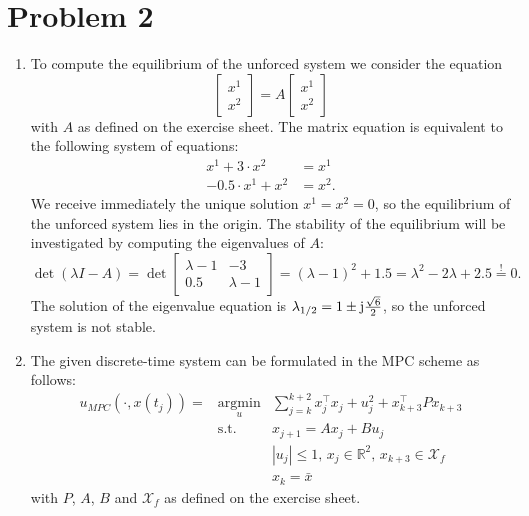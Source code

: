 \documentclass[12pt,pdftex,a4paper]{scrartcl}
\DeclareMathOperator*{\argmin}{argmin}
\begin{document}
\newpage
\section*{Problem 2}
\begin{enumerate}
    \item To compute the equilibrium of the unforced system we consider the equation
    \begin{equation*}
         \begin{bmatrix}
             x^1 \\ x^2
         \end{bmatrix}
         = A
         \begin{bmatrix}
             x^1 \\ x^2
         \end{bmatrix}
    \end{equation*}
    with $A$ as defined on the exercise sheet. The matrix equation is equivalent to the following system of equations:
    \begin{align*}
         x^1 + 3 \cdot x^2 &= x^1 \\
         -0.5 \cdot x^1 +x^2 &= x^2.
    \end{align*}
    We receive immediately the unique solution $x^1 = x^2 = 0$, so the equilibrium of the unforced system lies in the origin. The stability of the equilibrium will be investigated by computing the eigenvalues of $A$:
    \begin{equation*}         
         \det (\lambda I - A) = \det
         \begin{bmatrix}
            \lambda -1 & -3 \\
            0.5 & \lambda -1
         \end{bmatrix}
         = (\lambda -1)^2 +1.5 = \lambda^2 -2 \lambda +2.5 \overset{!}{=} 0.
    \end{equation*}
    The solution of the eigenvalue equation is $\lambda_{1/2} = 1 \pm \im \frac{\sqrt{6}}{2}$, so the unforced system is not stable.
    \item The given discrete-time system can be formulated in the MPC scheme as follows:
    \begin{equation*} 
    \begin{array}{rcl} 
    u_{MPC} (\cdot , x(t_j)) = &\argmin\limits_u& \sum\limits_{j=k}^{k+2} x_j^\top x_j + u_j^2 +x_{k+3}^\top P x_{k+3} \\ 
    &\mathrm{s.t.}& x_{j+1} = A x_j + B u_j \\ 
    & & |u_j| \leq 1,\, x_j \in \mathbb{R}^2,\, x_{k+3} \in \mathcal{X}_f \\
    & & x_k = \bar{x}
    \end{array}      
    \end{equation*}
    with $P$, $A$, $B$ and $\mathcal{X}_f$ as defined on the exercise sheet.
    

\end{enumerate}
\end{document}
